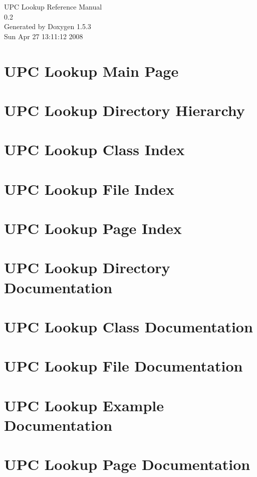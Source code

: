 \documentclass[letterpaper]{book}
\begin{document}
\begin{titlepage}
\vspace*{7cm}
\begin{center}
{\Large UPC Lookup Reference Manual\\[1ex]\large 0.2 }\\
\vspace*{1cm}
{\large Generated by Doxygen 1.5.3}\\
\vspace*{0.5cm}
{\small Sun Apr 27 13:11:12 2008}\\
\end{center}
\end{titlepage}
\clearemptydoublepage
{}
\tableofcontents
\clearemptydoublepage
{}
\chapter{UPC Lookup Main Page}
\label{index}\hypertarget{index}{}
\chapter{UPC Lookup Directory Hierarchy}

\chapter{UPC Lookup Class Index}

\chapter{UPC Lookup File Index}

\chapter{UPC Lookup Page Index}

\chapter{UPC Lookup Directory Documentation}

\chapter{UPC Lookup Class Documentation}

\chapter{UPC Lookup File Documentation}










\chapter{UPC Lookup Example Documentation}

\chapter{UPC Lookup Page Documentation}




\printindex
\end{document}
